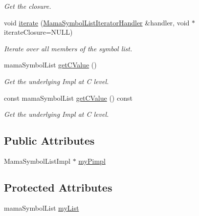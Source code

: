 \begin{DoxyCompactItemize}
\begin{DoxyCompactList}\small\item\em Get the closure. \item\end{DoxyCompactList}\item 
void \hyperlink{classWombat_1_1MamaSymbolList_abd26a14e154744f08713aab75c9aece3}{iterate} (\hyperlink{classWombat_1_1MamaSymbolListIteratorHandler}{MamaSymbolListIteratorHandler} \&handler, void $\ast$iterateClosure=NULL)
\begin{DoxyCompactList}\small\item\em Iterate over all members of the symbol list. \item\end{DoxyCompactList}\item 
mamaSymbolList \hyperlink{classWombat_1_1MamaSymbolList_a1a1457638a518b7df33505a7f67de2dc}{getCValue} ()
\begin{DoxyCompactList}\small\item\em Get the underlying Impl at C level. \item\end{DoxyCompactList}\item 
const mamaSymbolList \hyperlink{classWombat_1_1MamaSymbolList_a532c57ed3ff01980ab120bc1a18e1d44}{getCValue} () const 
\begin{DoxyCompactList}\small\item\em Get the underlying Impl at C level. \item\end{DoxyCompactList}\end{DoxyCompactItemize}
\subsection*{Public Attributes}
\begin{DoxyCompactItemize}
\item 
MamaSymbolListImpl $\ast$ \hyperlink{classWombat_1_1MamaSymbolList_a667701e35a1811964b33670b3db49d64}{myPimpl}
\end{DoxyCompactItemize}
\subsection*{Protected Attributes}
\begin{DoxyCompactItemize}
\item 
mamaSymbolList \hyperlink{classWombat_1_1MamaSymbolList_a2daed37d9169d83bbe7e2cbf3bd3d6bc}{myList}
\end{DoxyCompactItemize}


